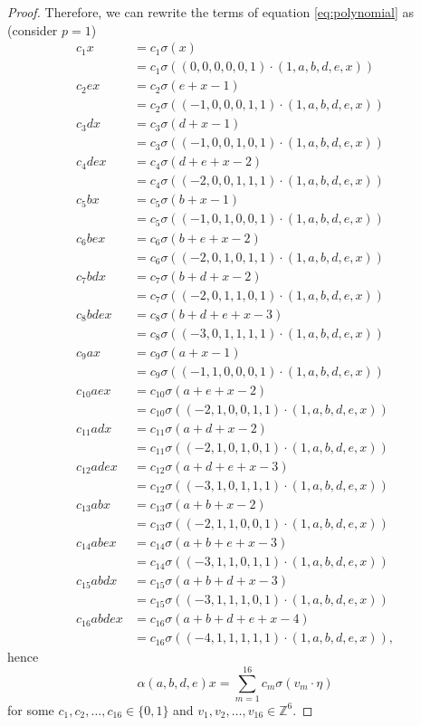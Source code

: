 \documentclass{book}
\theoremstyle{definition}
\theoremstyle{plain}
\theoremstyle{plain}
\theoremstyle{remark}
\theoremstyle{plain}
\begin{document}
\begin{proof}
		Therefore, we can rewrite the terms of equation \ref{eq:polynomial} as (consider $p=1$)
		\begingroup
		\allowdisplaybreaks
		\begin{align*} 
			c_1x    	&= c_1\sigma(x) \\
						&= c_1\sigma((0,0,0,0,0,1)\cdot(1,a,b,d,e,x)) \\
			c_2ex    	&= c_2\sigma(e+x-1) \\
						&= c_2\sigma((-1,0,0,0,1,1)\cdot(1,a,b,d,e,x)) \\
			c_3dx    	&= c_3\sigma(d+x-1) \\
						&= c_3\sigma((-1,0,0,1,0,1)\cdot(1,a,b,d,e,x)) \\
			c_4dex    	&= c_4\sigma(d+e+x-2) \\
						&= c_4\sigma((-2,0,0,1,1,1)\cdot(1,a,b,d,e,x)) \\
			c_5bx       &= c_5\sigma(b+x-1) \\
						&= c_5\sigma((-1,0,1,0,0,1)\cdot(1,a,b,d,e,x)) \\
			c_6bex      &= c_6\sigma(b+e+x-2) \\
						&= c_6\sigma((-2,0,1,0,1,1)\cdot(1,a,b,d,e,x)) \\
			c_7bdx      &= c_7\sigma(b+d+x-2) \\
						&= c_7\sigma((-2,0,1,1,0,1)\cdot(1,a,b,d,e,x)) \\
			c_8bdex     &= c_8\sigma(b+d+e+x-3) \\
						&= c_8\sigma((-3,0,1,1,1,1)\cdot(1,a,b,d,e,x)) \\
			c_9ax    	&= c_9\sigma(a+x-1) \\
						&= c_9\sigma((-1,1,0,0,0,1)\cdot(1,a,b,d,e,x)) \\
			c_{10}aex   &= c_{10}\sigma(a+e+x-2) \\
						&= c_{10}\sigma((-2,1,0,0,1,1)\cdot(1,a,b,d,e,x)) \\
			c_{11}adx 	&= c_{11}\sigma(a+d+x-2) \\
						&= c_{11}\sigma((-2,1,0,1,0,1)\cdot(1,a,b,d,e,x)) \\
			c_{12}adex 	&= c_{12}\sigma(a+d+e+x-3) \\
						&= c_{12}\sigma((-3,1,0,1,1,1)\cdot(1,a,b,d,e,x)) \\
			c_{13}abx 	&= c_{13}\sigma(a+b+x-2) \\
						&= c_{13}\sigma((-2,1,1,0,0,1)\cdot(1,a,b,d,e,x)) \\
			c_{14}abex  &= c_{14}\sigma(a+b+e+x-3) \\
						&= c_{14}\sigma((-3,1,1,0,1,1)\cdot(1,a,b,d,e,x)) \\
			c_{15}abdx  &= c_{15}\sigma(a+b+d+x-3) \\
						&= c_{15}\sigma((-3,1,1,1,0,1)\cdot(1,a,b,d,e,x)) \\
			c_{16}abdex &= c_{16}\sigma(a+b+d+e+x-4) \\
						&= c_{16}\sigma((-4,1,1,1,1,1)\cdot(1,a,b,d,e,x)),
		\end{align*}
		\endgroup
		hence 
		$$ 
			\alpha(a,b,d,e)x=\sum_{m=1}^{16}c_m\sigma(v_m\cdot\eta)
		$$
		for some $c_1,c_2,\dots,c_{16}\in\{0,1\}$ and $v_1,v_2,\dots,v_{16}\in\mathbb{Z}^6$.
		

\end{proof}
\end{document}
